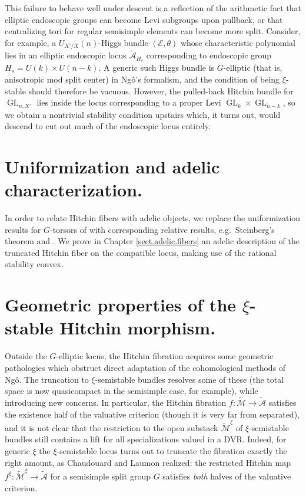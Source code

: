 \documentclass[openany]{amsbook}
\theoremstyle{definition}
\theoremstyle{remark}
\numberwithin{equation}{section}
\newcommand{\cA}{\mathcal{A}}
\newcommand{\cM}{\mathcal{M}}
\newcommand{\cE}{\mathcal{E}}
\renewcommand{\-}{\operatorname{-}}
\newcommand{\GL}{\operatorname{GL}}
\newcommand{\ctM}{\widetilde{\cM}}
\newcommand{\ctA}{\widetilde{\cA}}
\begin{document}
This failure to behave well under descent is a reflection of the arithmetic fact that elliptic endoscopic groups can become Levi subgroups upon pullback, or that centralizing tori for regular semisimple elements can become more split. Consider, for example, a $U_{X'/X}(n)$-Higgs bundle $(\cE, \theta)$ whose characteristic polynomial lies in an elliptic endoscopic locus $\ctA_{H_s}$ corresponding to endoscopic group $H_s = U(k) \times U(n-k)$. A generic such Higgs bundle is $G$-elliptic (that is, anisotropic mod split center) in Ng\^{o}'s formalism, and the condition of being $\xi$-stable should therefore be vacuous. However, the pulled-back Hitchin bundle for $\GL_{n,X'}$ lies inside the locus corresponding to a proper Levi $\GL_k \times \GL_{n-k}$, so we obtain a nontrivial stability condition upstairs which, it turns out, would descend to cut out much of the endoscopic locus entirely.

\section{Uniformization and adelic characterization.}

In order to relate Hitchin fibers with adelic objects, we replace the uniformization results for $G$-torsors of \cite{drinfeldsimpson} with corresponding relative results, e.g.\ Steinberg's theorem and \cite{HeinlothRelUnif}. We prove in Chapter \ref{sect.adelic.fibers} an adelic description of the truncated Hitchin fiber on the compatible locus, making use of the rational stability convex.

\section{\texorpdfstring{Geometric properties of the $\xi$-stable Hitchin morphism.}{Geometric properties of the xi-stable Hitchin morphism.}}

Outside the $G$-elliptic locus, the Hitchin fibration acquires some geometric pathologies which obstruct direct adaptation of the cohomological methods of Ng\^{o}. The truncation to $\xi$-semistable bundles resolves some of these (the total space is now quasicompact in the semisimple case, for example), while introducing new concerns. In particular, the Hitchin fibration $f : \ctM \to \ctA$ satisfies the existence half of the valuative criterion (though it is very far from separated), and it is not clear that the restriction to the open substack $\ctM^{\xi}$ of $\xi$-semistable bundles still contains a lift for all specializations valued in a DVR. Indeed, for generic $\xi$ the $\xi$-semistable locus turns out to truncate the fibration exactly the right amount, as Chaudouard and Laumon realized: the restricted Hitchin map $f^\xi : \ctM^{\xi} \to \ctA$ for a semisimple split group $G$ satisfies \emph{both} halves of the valuative criterion. 
\end{document}
